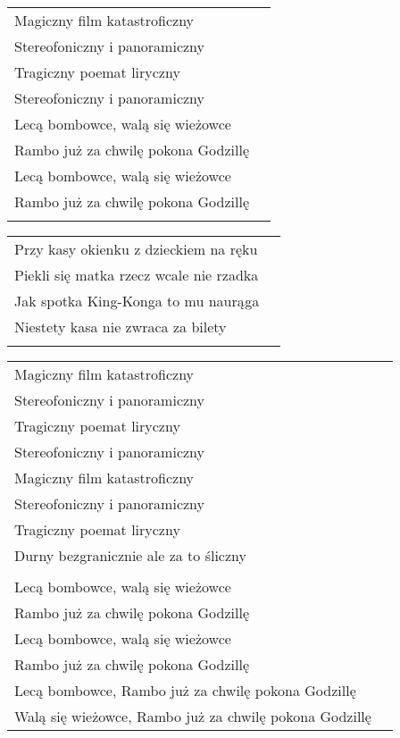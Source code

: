 \documentclass[a5paper]{article}
\begin{document}
\noindent
\begin{tabular}{@{}p{6.50cm}p{3cm}@{}}
Magiczny film katastroficzny \\
Stereofoniczny i panoramiczny \\
Tragiczny poemat liryczny \\
Stereofoniczny i panoramiczny \\
Lecą bombowce, walą się wieżowce \\
Rambo już za chwilę pokona Godzillę \\
Lecą bombowce, walą się wieżowce \\
Rambo już za chwilę pokona Godzillę \\ \\
\end{tabular}

\noindent
\begin{tabular}{@{}p{6.50cm}p{3cm}@{}}
Przy kasy okienku z dzieckiem na ręku \\
Piekli się matka rzecz wcale nie rzadka \\
Jak spotka King-Konga to mu naurąga \\
Niestety kasa nie zwraca za bilety \\ \\
\end{tabular}

\noindent
\begin{tabular}{@{}p{10.50cm}p{3cm}@{}}
Magiczny film katastroficzny \\
Stereofoniczny i panoramiczny \\
Tragiczny poemat liryczny \\
Stereofoniczny i panoramiczny \\
Magiczny film katastroficzny \\
Stereofoniczny i panoramiczny \\
Tragiczny poemat liryczny \\
Durny bezgranicznie ale za to śliczny \\ \\

Lecą bombowce, walą się wieżowce \\
Rambo już za chwilę pokona Godzillę \\ 
Lecą bombowce, walą się wieżowce \\
Rambo już za chwilę pokona Godzillę \\
Lecą bombowce, Rambo już za chwilę pokona Godzillę \\
Walą się wieżowce, Rambo już za chwilę pokona Godzillę
\end{tabular}
\end{document}
